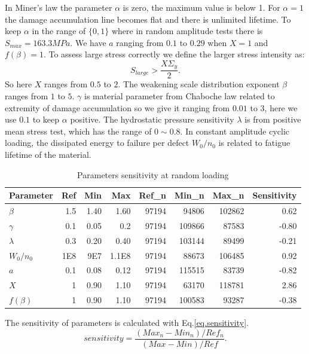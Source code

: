 \documentclass[3p,times,number,review]{elsarticle}
\begin{document}
In Miner's law the parameter $\alpha$ is zero, the maximum value is below 1. For $\alpha=1$ the damage accumulation line becomes flat and there is unlimited lifetime. To keep $\alpha$ in the range of $\{0,1\}$ where in random amplitude tests there is $S_{max}=163.3MPa$. We have $a$ ranging from $0.1$ to $0.29$ when $X=1$ and $f(\beta)=1$. 
To assess large stress correctly we define the larger stress intensity as: 
$$S_{large}>\dfrac{X\Sigma_y}{2}.$$ 
So here $X$ ranges from $0.5$ to $2$. The weakening scale distribution exponent $\beta$ ranges from $1$ to $5$. $\gamma$ is  material parameter from Chaboche law related to extremity of damage accumulation so we give it ranging from $0.01$ to $3$, here we use $0.1$ to keep $\alpha$ positive. The hydrostatic pressure sensitivity $\lambda$ is from positive mean stress test, which has the range of $0\sim0.8$. In constant amplitude cyclic loading, the dissipated energy to failure per defect $W_0/n_0$ is related to fatigue lifetime of the material.


\begin{table}[]
	\centering
	\begin{tabular}{l|rrr|rrr|r}
		\hline
		\textbf{Parameter}        & \textbf{Ref} & \textbf{Min} & \textbf{Max} & \textbf{Ref\_n} & \textbf{Min\_n} & \textbf{Max\_n} & \textbf{Sensitivity} \\ \hline
		\textbf{$\beta$}          & 1.5                      & 1.40         & 1.60         & 97194                 & 94806           & 102862          & 0.62                 \\
		\textbf{$\gamma$}         & 0.1                        & 0.05         & 0.2         & 97194                 & 109866          & 87583           & -0.80                \\
		\textbf{$\lambda$}        & 0.3                      & 0.20         & 0.40         & 97194                 & 103144          & 89499           & -0.21                \\
		\textbf{$W_0/n_0$}        & 1E8                      & 9E7          & 1.1E8        & 97194                 & 88673           & 106485          & 0.92                 \\
		\textbf{$a$}              & 0.1                      & 0.08         & 0.12         & 97194                 & 115515          & 83739           & -0.82                \\
		\textbf{$X$}              & 1                        & 0.90         & 1.10         & 97194                 & 63170           & 118781          & 2.86                 \\
		\textbf{$f(\beta)$} & 1                        & 0.90         & 1.10         & 97194                 & 100583          & 93287           & -0.38                \\ \hline
	\end{tabular}
	\caption{Parameters sensitivity at random loading}
	\label{sensitivity}
\end{table}
The sensitivity of parameters is calculated with Eq.\eqref{eq.sensitivity}.
\begin{equation}
sensitivity = \dfrac{\left( Max_n-Min_n\right)/Ref_n}{\left( Max-Min\right)/Ref}.
\label{eq.sensitivity}
\end{equation}
\end{document}
